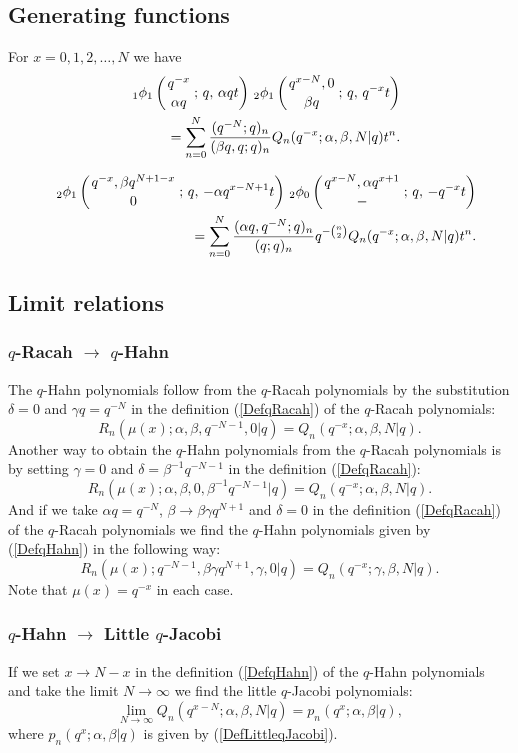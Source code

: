 \documentclass[envcountchap,graybox]{svmono}
\newcounter{rom}
\newcommand{\qhyp}[5]{\mbox{}_{#1}{\phi}_{#2}
\left(\genfrac{}{}{0pt}{}{#3}{#4}\,;\,q,\,#5\right)}
\begin{document}
\subsection*{Generating functions} For $x=0,1,2,\ldots,N$ we have
\begin{eqnarray}
\label{GenqHahn1}
& &\qhyp{1}{1}{q^{-x}}{\alpha q}{\alpha qt}\,\qhyp{2}{1}{q^{x-N},0}{\beta q}{q^{-x}t}\nonumber\\
& &{}=\sum_{n=0}^N\frac{(q^{-N};q)_n}{(\beta q,q;q)_n}Q_n(q^{-x};\alpha,\beta,N|q)t^n.
\end{eqnarray}

\begin{eqnarray}
\label{GenqHahn2}
& &\qhyp{2}{1}{q^{-x},\beta q^{N+1-x}}{0}{-\alpha q^{x-N+1}t}\,
\qhyp{2}{0}{q^{x-N},\alpha q^{x+1}}{-}{-q^{-x}t}\nonumber\\
& &{}=\sum_{n=0}^N\frac{(\alpha q,q^{-N};q)_n}{(q;q)_n}q^{-\binom{n}{2}}Q_n(q^{-x};\alpha,\beta,N|q)t^n.
\end{eqnarray}

\subsection*{Limit relations}

\subsubsection*{$q$-Racah $\rightarrow$ $q$-Hahn}
The $q$-Hahn polynomials follow from the $q$-Racah polynomials by the substitution
$\delta=0$ and $\gamma q=q^{-N}$ in the definition (\ref{DefqRacah}) of the
$q$-Racah polynomials:
$$R_n(\mu(x);\alpha,\beta,q^{-N-1},0|q)=Q_n(q^{-x};\alpha,\beta,N|q).$$
Another way to obtain the $q$-Hahn polynomials from the $q$-Racah
polynomials is by setting $\gamma=0$ and $\delta=\beta^{-1}q^{-N-1}$ in the definition
(\ref{DefqRacah}):
$$R_n(\mu(x);\alpha,\beta,0,\beta^{-1}q^{-N-1}|q)=Q_n(q^{-x};\alpha,\beta,N|q).$$
And if we take $\alpha q=q^{-N}$, $\beta\rightarrow\beta\gamma q^{N+1}$ and $\delta=0$ in the
definition (\ref{DefqRacah}) of the $q$-Racah polynomials we find the
$q$-Hahn polynomials given by (\ref{DefqHahn}) in the following way:
$$R_n(\mu(x);q^{-N-1},\beta\gamma q^{N+1},\gamma,0|q)=Q_n(q^{-x};\gamma,\beta,N|q).$$
Note that $\mu(x)=q^{-x}$ in each case.

\subsubsection*{$q$-Hahn $\rightarrow$ Little $q$-Jacobi}
If we set $x\rightarrow N-x$ in the definition (\ref{DefqHahn}) of the $q$-Hahn
polynomials and take the limit $N\rightarrow\infty$ we find the little $q$-Jacobi polynomials:
\begin{equation}
\lim _{N\rightarrow\infty} Q_n(q^{x-N};\alpha,\beta,N|q)=p_n(q^x;\alpha,\beta|q),
\end{equation}
where $p_n(q^x;\alpha,\beta|q)$ is given by (\ref{DefLittleqJacobi}).
\end{document}
